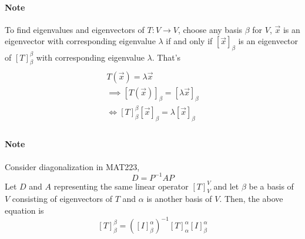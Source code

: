 \documentclass[11pt]{article}
\newcommand{\trans}[3]{{#1}: {#2} \to {#3}}
\newcommand{\coor}[2]{[\vec{{#1}}]_{{#2}}}
\newcommand{\tmat}[3]{[{#1}]_{{#2}}^{{#3}}}
\begin{document}
	\paragraph{Note} To find eigenvalues and eigenvectors of $\trans{T}{V}{V}$, choose any basis $\beta$ for $V$, $\vec{x}$ is an eigenvector with corresponding eigenvalue $\lambda$ if and only if $\coor{x}{\beta}$ is an eigenvector of $\tmat{T}{\beta}{\beta}$ with corresponding eigenvalue $\lambda$.
	\newline That's
	\begin{multline*}
		\\
		T(\vec{x}) = \lambda \vec{x} \\
		\implies [T(\vec{x})]_{\beta} = [\lambda\vec{x}]_{\beta} \\
		\iff \tmat{T}{\beta}{\beta} \coor{x}{\beta} = \lambda \coor{x}{\beta} \\
	\end{multline*}
	\paragraph{Note} Consider diagonalization in MAT223, 
	\[
	D = P^{-1}AP
	\]
	Let $D$ and $A$ representing the same linear operator $\tmat{T}{V}{V}$ and let $\beta$ be a basis of $V$ consisting of eigenvectors of $T$ and $\alpha$ is another basis of $V$.
	Then, the above equation is 
	\[
	\tmat{T}{\beta}{\beta} = (\tmat{I}{\beta}{\alpha})^{-1} \tmat{T}{\alpha}{\alpha} \tmat{I}{\beta}{\alpha}
	\]
	
\end{document}
